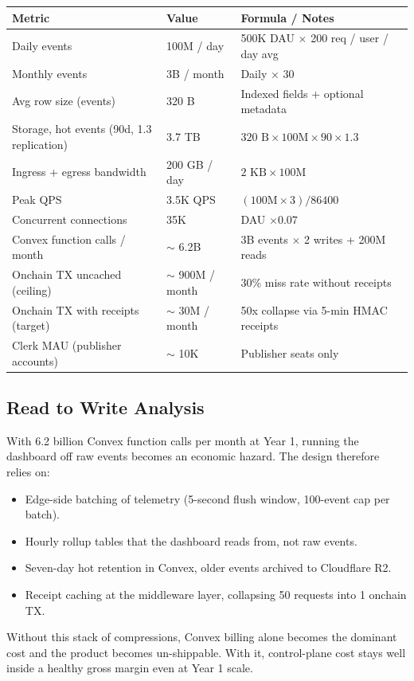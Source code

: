\documentclass[11pt,a4paper]{article}
\newcommand{\iconBolt}{\textcolor{tollgatepink}{\faBolt}}
\begin{document}
\begin{table}[H]
\centering
\footnotesize
\begin{tabularx}{\textwidth}{@{} l l X @{}}
\toprule
\textbf{Metric} & \textbf{Value} & \textbf{Formula / Notes} \\
\midrule
Daily events & 100M / day & 500K DAU $\times$ 200 req / user / day avg \\
Monthly events & 3B / month & Daily $\times$ 30 \\
Avg row size (events) & 320 B & Indexed fields + optional metadata \\
Storage, hot events (90d, 1.3 replication) & 3.7 TB & $320 \text{ B} \times 100\text{M} \times 90 \times 1.3$ \\
Ingress + egress bandwidth & 200 GB / day & $2\text{ KB} \times 100\text{M}$ \\
Peak QPS & 3.5K QPS & $(100\text{M} \times 3) / 86400$ \\
Concurrent connections & 35K & DAU $\times 0.07$ \\
Convex function calls / month & $\sim$ 6.2B & 3B events $\times$ 2 writes + 200M reads \\
Onchain TX uncached (ceiling) & $\sim$ 900M / month & 30\% miss rate without receipts \\
Onchain TX with receipts (target) & $\sim$ 30M / month & 50x collapse via 5-min HMAC receipts \\
Clerk MAU (publisher accounts) & $\sim$ 10K & Publisher seats only \\
\bottomrule
\end{tabularx}
\end{table}

\subsection{Read to Write Analysis}

\begin{archbox}[title={\iconBolt~ Design implication}]
With 6.2 billion Convex function calls per month at Year 1, running the dashboard off raw events becomes an economic hazard. The design therefore relies on:

\begin{itemize}[leftmargin=*]
  \item Edge-side batching of telemetry (5-second flush window, 100-event cap per batch).
  \item Hourly rollup tables that the dashboard reads from, not raw events.
  \item Seven-day hot retention in Convex, older events archived to Cloudflare R2.
  \item Receipt caching at the middleware layer, collapsing 50 requests into 1 onchain TX.
\end{itemize}

Without this stack of compressions, Convex billing alone becomes the dominant cost and the product becomes un-shippable. With it, control-plane cost stays well inside a healthy gross margin even at Year 1 scale.
\end{archbox}
\end{document}
